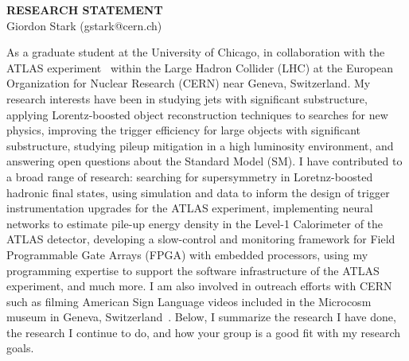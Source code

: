 \documentclass[letterpaper, 10pt]{article}
\begin{document}
\thispagestyle{fancy}
\lhead{}
\rhead{}
\renewcommand{\headrulewidth}{0pt}
\renewcommand{\footrulewidth}{0pt}

\pagestyle{fancy}
\lhead{\textcolor{gray}{\it Giordon Stark}}
\rhead{\textcolor{gray}{\thepage/\totalpages{}}}

\begin{center}
{\LARGE \bf RESEARCH STATEMENT}\\
\vspace*{0.1cm}
{\normalsize Giordon Stark (gstark@cern.ch)}
\end{center}

As a graduate student at the University of Chicago, in collaboration with the ATLAS experiment~ within the Large Hadron Collider (LHC) at the European Organization for Nuclear Research (CERN) near Geneva, Switzerland. My research interests have been in studying jets with significant substructure, applying Lorentz-boosted object reconstruction techniques to searches for new physics, improving the trigger efficiency for large objects with significant substructure, studying pileup mitigation in a high luminosity environment, and answering open questions about the Standard Model (SM). I have contributed to a broad range of research: searching for supersymmetry in Loretnz-boosted hadronic final states, using simulation and data to inform the design of trigger instrumentation upgrades for the ATLAS experiment, implementing neural networks to estimate pile-up energy density in the Level-1 Calorimeter of the ATLAS detector, developing a slow-control and monitoring framework for Field Programmable Gate Arrays (FPGA) with embedded processors, using my programming expertise to support the software infrastructure of the ATLAS experiment, and much more. I am also involved in outreach efforts with CERN such as filming American Sign Language videos included in the Microcosm museum in Geneva, Switzerland~. Below, I summarize the research I have done, the research I continue to do, and how your group is a good fit with my research goals.

\end{document}
